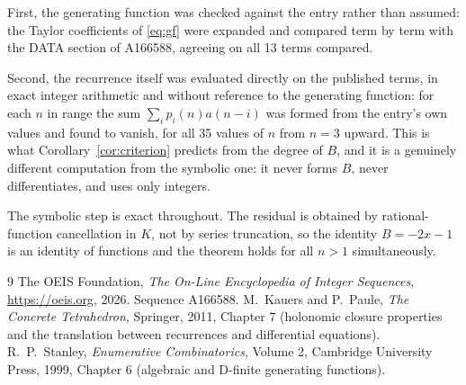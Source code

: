 \documentclass[11pt,a4paper]{article}
\theoremstyle{plain}
\theoremstyle{definition}
\begin{document}
First, the generating function was checked against the entry rather than assumed: the
Taylor coefficients of \eqref{eq:gf} were expanded and compared term by term with the DATA
section of A166588, agreeing on all 13 terms compared.

Second, the recurrence itself was evaluated directly on the published terms, in exact
integer arithmetic and without reference to the generating function: for each $n$ in range
the sum $\sum_{i}p_{i}(n)a(n-i)$ was formed from the entry's own values and found to
vanish, for all 35 values of $n$ from $n=3$ upward. This is what
Corollary~\ref{cor:criterion} predicts from the degree of $B$, and it is a genuinely
different computation from the symbolic one: it never forms $B$, never differentiates, and
uses only integers.

The symbolic step is exact throughout. The residual is obtained by rational-function
cancellation in $K$, not by series truncation, so the identity $B=- 2 x - 1$ is an
identity of functions and the theorem holds for all $n>1$ simultaneously.

\begin{thebibliography}{9}
 The OEIS Foundation, \emph{The On-Line Encyclopedia of Integer Sequences},
\url{https://oeis.org}, 2026. Sequence A166588.
 M.~Kauers and P.~Paule, \emph{The Concrete Tetrahedron}, Springer, 2011,
Chapter 7 (holonomic closure properties and the translation between recurrences and
differential equations).
 R.~P.~Stanley, \emph{Enumerative Combinatorics}, Volume 2, Cambridge
University Press, 1999, Chapter 6 (algebraic and D-finite generating functions).
\end{thebibliography}
\end{document}
